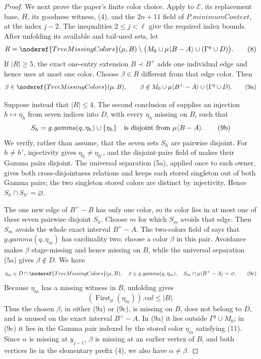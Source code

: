 \begin{proof}
We next prove the paper's finite color choice.  Apply  to
\(\mathcal E\), its replacement base, \(H\), its goodness witness, (4),
and the \(2n+11\) field of \(P.\mathit{minimumContext}\), at the index
\(j-2\).  The inequalities \(2\leq j<\ell\) give the required index
bounds.  After unfolding its available and tail-used sets, let
\[
 R=\noderef{TreeMissingColors}(\mu,B)\setminus
       \bigl(M_0\cup\mu\langle B-A\rangle
                    \cup(\Gamma^q\cup D)\bigr).              \tag{8}
\]
If \(|R|\geq5\), the exact one-entry extension \(B\prec B^+\) adds one
individual edge and hence uses at most one color.  Choose
\(\beta\in R\) different from that edge color.  Then
\[
 \beta\in\noderef{TreeMissingColors}(\mu,B),\qquad
 \beta\notin M_0\cup\mu\langle B^+-A\rangle
                     \cup(\Gamma^q\cup D).                  \tag{9a}
\]

Suppose instead that \(|R|\leq4\).  The second conclusion of
 supplies an injection
\(h\mapsto\eta_h\) from seven indices into \(D\), with every
\(\eta_h\) missing on \(B\), such that
\[
 S_h=g.\mathit{gamma}(q,\eta_h)\cup\{\eta_h\}
       \quad\hbox{is disjoint from }\mu\langle B-A\rangle.   \tag{9b}
\]
We verify, rather than assume, that the seven sets \(S_h\) are pairwise
disjoint.  For \(h\ne h'\), injectivity gives
\(\eta_h\ne\eta_{h'}\), and the disjoint-pairs field of
 makes their Gamma pairs disjoint.  The universal
separation (5a), applied once to each owner, gives both cross-disjointness
relations and keeps each stored singleton out of both Gamma pairs; the
two singleton stored colors are distinct by injectivity.  Hence
\(S_h\cap S_{h'}=\varnothing\).

The one new edge of \(B^+-B\) has only one color, so its color lies in at
most one of these seven pairwise disjoint \(S_h\).  Choose \(m\) for
which \(S_m\) avoids that edge.  Then \(S_m\) avoids the whole exact
interval \(B^+-A\).  The two-colors field of
 says that
\(g.\mathit{gamma}(q,\eta_m)\) has cardinality two;
choose a color \(\beta\) in this pair.  Avoidance makes \(\beta\)
stage-missing and hence missing on \(B\), while the universal separation
(5a) gives
\(\beta\notin D\).  We have
\[
 \eta_m\in D\cap\noderef{TreeMissingColors}(\mu,B),\quad
 \beta\in g.\mathit{gamma}(q,\eta_m),\quad
 S_m\cap\mu\langle B^+-A\rangle=\varnothing.                \tag{9c}
\]
Because \(\eta_m\) has a missing witness in \(B\), unfolding
 gives
\[
       (\operatorname{First}_{\mu}(\eta_m)).\mathit{val}
                                                     \leq |B|.\tag{11}
\]
Thus the chosen \(\beta\), in either (9a) or (9c), is missing on \(B\),
does not belong to \(D\), and is unused on the exact interval
\(B^+-A\).  In (9a) it lies outside \(\Gamma^q\cup M_0\); in (9c) it
lies in the Gamma pair indexed by the stored color \(\eta_m\) satisfying
(11).  Since \(\alpha\) is missing at \(y_{j-1}\), \(\beta\) is missing
at an earlier vertex of \(B\), and both vertices lie in the elementary
prefix (4), we also have \(\alpha\ne\beta\).


\end{proof}
